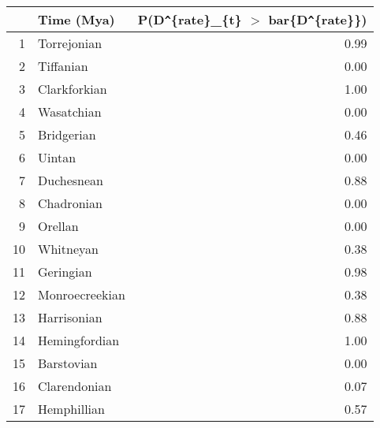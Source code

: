 \begin{table}[ht]
\centering
\begin{tabular}{rlr}
  \hline
 & Time (Mya) & P(D\verb|^|\{rate\}\_\{t\} $>$ bar\{D\verb|^|\{rate\}\}) \\ 
  \hline
1 & Torrejonian & 0.99 \\ 
  2 & Tiffanian & 0.00 \\ 
  3 & Clarkforkian & 1.00 \\ 
  4 & Wasatchian & 0.00 \\ 
  5 & Bridgerian & 0.46 \\ 
  6 & Uintan & 0.00 \\ 
  7 & Duchesnean & 0.88 \\ 
  8 & Chadronian & 0.00 \\ 
  9 & Orellan & 0.00 \\ 
  10 & Whitneyan & 0.38 \\ 
  11 & Geringian & 0.98 \\ 
  12 & Monroecreekian & 0.38 \\ 
  13 & Harrisonian & 0.88 \\ 
  14 & Hemingfordian & 1.00 \\ 
  15 & Barstovian & 0.00 \\ 
  16 & Clarendonian & 0.07 \\ 
  17 & Hemphillian & 0.57 \\ 
   \hline
\end{tabular}
\label{tab:rate_peak}
\end{table}
